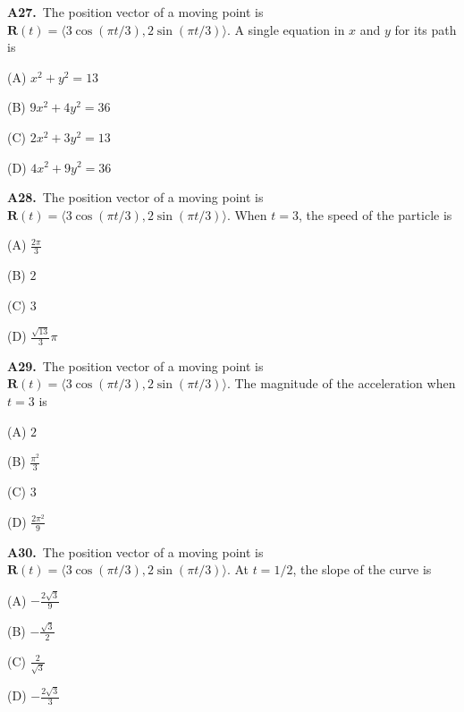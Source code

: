 \documentclass[11pt]{article}
\begin{document}
\bigskip\noindent\textbf{A27.}\ The position vector of a moving point is $\mathbf R(t)=\langle3\cos(\pi t/3),2\sin(\pi t/3)\rangle$. A single equation in $x$ and $y$ for its path is
\begin{list}{}{\setlength{\leftmargin}{3em}\setlength{\labelwidth}{2.5em}\setlength{\itemsep}{0pt}\setlength{\topsep}{2pt}}
\item[(A)] $x^2+y^2=13$
\item[(B)] $9x^2+4y^2=36$
\item[(C)] $2x^2+3y^2=13$
\item[(D)] $4x^2+9y^2=36$
\end{list}

\bigskip\noindent\textbf{A28.}\ The position vector of a moving point is $\mathbf R(t)=\langle3\cos(\pi t/3),2\sin(\pi t/3)\rangle$. When $t=3$, the speed of the particle is
\begin{list}{}{\setlength{\leftmargin}{3em}\setlength{\labelwidth}{2.5em}\setlength{\itemsep}{0pt}\setlength{\topsep}{2pt}}
\item[(A)] $\frac{2\pi}3$
\item[(B)] $2$
\item[(C)] $3$
\item[(D)] $\frac{\sqrt{13}}3\pi$
\end{list}

\bigskip\noindent\textbf{A29.}\ The position vector of a moving point is $\mathbf R(t)=\langle3\cos(\pi t/3),2\sin(\pi t/3)\rangle$. The magnitude of the acceleration when $t=3$ is
\begin{list}{}{\setlength{\leftmargin}{3em}\setlength{\labelwidth}{2.5em}\setlength{\itemsep}{0pt}\setlength{\topsep}{2pt}}
\item[(A)] $2$
\item[(B)] $\frac{\pi^2}3$
\item[(C)] $3$
\item[(D)] $\frac{2\pi^2}9$
\end{list}

\bigskip\noindent\textbf{A30.}\ The position vector of a moving point is $\mathbf R(t)=\langle3\cos(\pi t/3),2\sin(\pi t/3)\rangle$. At $t=1/2$, the slope of the curve is
\begin{list}{}{\setlength{\leftmargin}{3em}\setlength{\labelwidth}{2.5em}\setlength{\itemsep}{0pt}\setlength{\topsep}{2pt}}
\item[(A)] $-\frac{2\sqrt3}9$
\item[(B)] $-\frac{\sqrt3}2$
\item[(C)] $\frac2{\sqrt3}$
\item[(D)] $-\frac{2\sqrt3}3$
\end{list}
\end{document}
